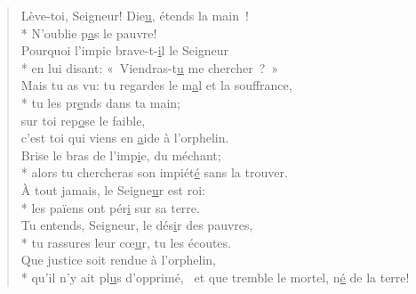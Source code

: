 \begin{verse}
Lève-toi, Seigneur! Die\underline{u}, étends la main ! \\*
N’oublie p\underline{a}s le pauvre! \\
Pourquoi l’impie brave-t-\underline{i}l le Seigneur \\*
en lui disant: « Viendras-t\underline{u} me chercher ? » \\

Mais tu as vu: tu regardes le m\underline{a}l et la souffrance, \\*
tu les pr\underline{e}nds dans ta main; \\
sur toi rep\underline{o}se le faible, \\
c’est toi qui viens en \underline{a}ide à l’orphelin. \\

Brise le bras de l’imp\underline{i}e, du méchant; \\*
alors tu chercheras son impiét\underline{é} sans la trouver. \\
À tout jamais, le Seigne\underline{u}r est roi: \\*
les païens ont pér\underline{i} sur sa terre. \\

Tu entends, Seigneur, le dés\underline{i}r des pauvres, \\*
tu rassures leur cœ\underline{u}r, tu les écoutes. \\
Que justice soit rendue à l’orphelin, \\*
qu’il n’y ait pl\underline{u}s d’opprimé,~\psalmstar
et que tremble le mortel, n\underline{é} de la terre! \\
\end{verse}

